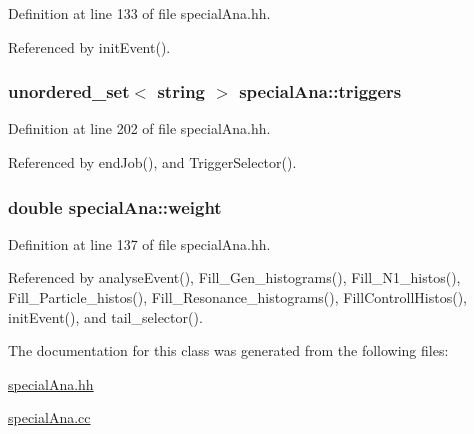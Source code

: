 Definition at line 133 of file special\-Ana.\-hh.



Referenced by init\-Event().

\subsubsection[{triggers}]{\setlength{\rightskip}{0pt plus 5cm}unordered\-\_\-set$<$ string $>$ special\-Ana\-::triggers}\label{classspecialAna_a7578000c63d8e3555315047763358e32}


Definition at line 202 of file special\-Ana.\-hh.



Referenced by end\-Job(), and Trigger\-Selector().

\subsubsection[{weight}]{\setlength{\rightskip}{0pt plus 5cm}double special\-Ana\-::weight}\label{classspecialAna_a093be544141cb52a9b5a1f5ef3bb7e32}


Definition at line 137 of file special\-Ana.\-hh.



Referenced by analyse\-Event(), Fill\-\_\-\-Gen\-\_\-histograms(), Fill\-\_\-\-N1\-\_\-histos(), Fill\-\_\-\-Particle\-\_\-histos(), Fill\-\_\-\-Resonance\-\_\-histograms(), Fill\-Controll\-Histos(), init\-Event(), and tail\-\_\-selector().



The documentation for this class was generated from the following files\-:\begin{DoxyCompactItemize}
\item 
\hyperlink{specialAna_8hh}{special\-Ana.\-hh}\item 
\hyperlink{specialAna_8cc}{special\-Ana.\-cc}\end{DoxyCompactItemize}
